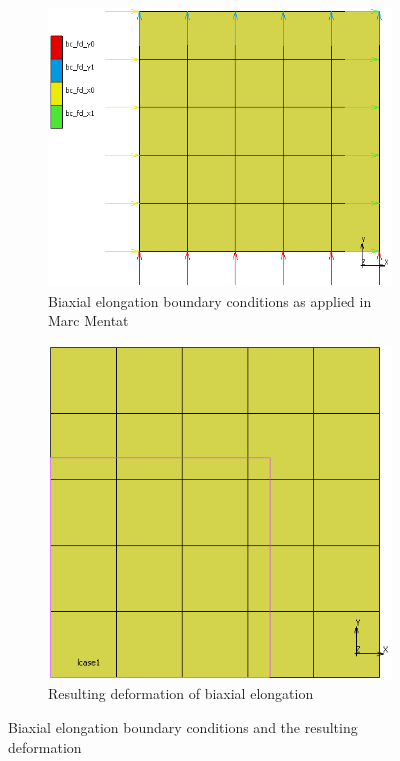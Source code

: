 \begin{figure}[H]
	\centering
	\begin{subfigure}[b]{0.4\textwidth}
		\centering
		\includegraphics[width=\textwidth]{C1BC.png}
		\caption{Biaxial elongation boundary conditions as applied in Marc Mentat}
		\label{fig:c2bc}
	\end{subfigure}
	\hfill
	\begin{subfigure}[b]{0.45\textwidth}
		\centering
		\includegraphics[width=\textwidth]{C2Def.png}
		\caption{Resulting deformation of biaxial elongation}
		\label{fig:c2def}
	\end{subfigure}
	\caption[Biaxial elongation boundary conditions and deformation]{Biaxial elongation boundary conditions and the resulting deformation}
	\label{fig:c2}
\end{figure}

